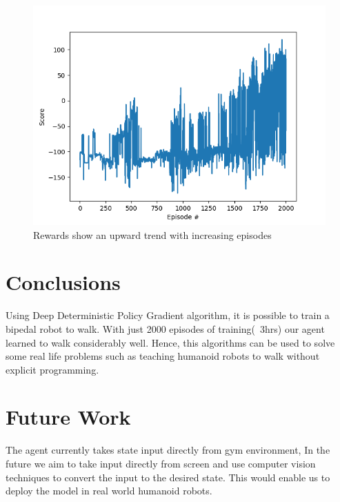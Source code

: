 \documentclass[a4paper]{article}
\begin{document}
\begin{figure}
\centering
\includegraphics[scale=0.98]{Pictures/graph.png}
\caption{Rewards show an upward trend with increasing episodes}
\label{Frog}
\end{figure}

\section*{Conclusions}
Using Deep Deterministic Policy Gradient algorithm, it is possible to train a bipedal robot to walk. With just 2000 episodes of training(~3hrs) our agent learned to walk considerably well. Hence, this algorithms can be used to solve some real life problems such as teaching humanoid robots to walk without explicit programming.

\section*{Future Work}
The agent currently takes state input directly from gym environment, In the future we aim to take input directly from screen and use computer vision techniques to convert the input to the desired state. This would enable us to deploy the model in real world humanoid robots.

\clearpage



\end{document}

